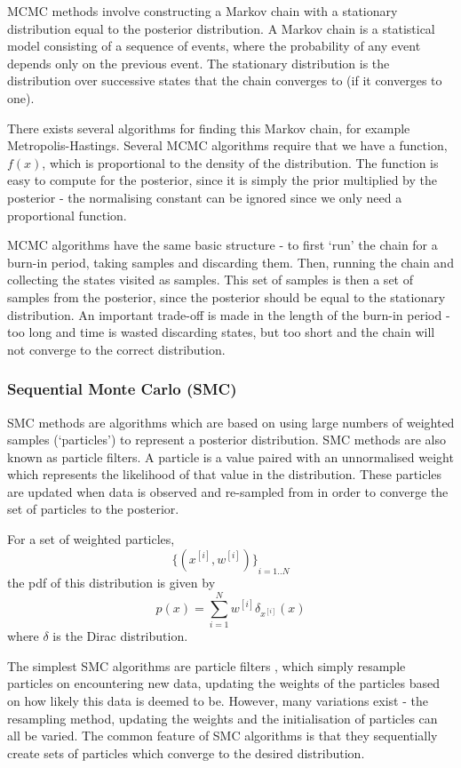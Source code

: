 MCMC methods involve constructing a Markov chain with a stationary distribution equal to the posterior distribution. A Markov chain is a statistical model consisting of a sequence of events, where the probability of any event depends only on the previous event. The stationary distribution is the distribution over successive states that the chain converges to (if it converges to one).
		
There exists several algorithms for finding this Markov chain, for example Metropolis-Hastings. Several MCMC algorithms require that we have a function, $f(x)$, which is proportional to the density of the distribution. The function is easy to compute for the posterior, since it is simply the prior multiplied by the posterior - the normalising constant can be ignored since we only need a proportional function.
		
MCMC algorithms have the same basic structure - to first `run' the chain for a burn-in period, taking samples and discarding them. Then, running the chain and collecting the states visited as samples. This set of samples is then a set of samples from the posterior, since the posterior should be equal to the stationary distribution. An important trade-off is made in the length of the burn-in period - too long and time is wasted discarding states, but too short and the chain will not converge to the correct distribution.
	
\subsubsection{Sequential Monte Carlo (SMC)}
	
SMC methods are algorithms which are based on using large numbers of weighted samples (`particles') to represent a posterior distribution. SMC methods are also known as particle filters. A particle is a value paired with an unnormalised weight which represents the likelihood of that value in the distribution. These particles are updated when data is observed and re-sampled from in order to converge the set of particles to the posterior.
	
For a set of weighted particles, 
\[{\{(x^{[i]}, w^{[i]})\}}_{i=1..N}\]
% 
the pdf of this distribution is given by
% 
\[
	p(x) = \sum_{i=1}^{N}w^{[i]}\delta_{x^{[i]}}(x)
\]
where $\delta$ is the Dirac distribution.
	
The simplest SMC algorithms are particle filters \cite{particlefilter}, which simply resample particles on encountering new data, updating the weights of the particles based on how likely this data is deemed to be. However, many variations exist - the resampling method, updating the weights and the initialisation of particles can all be varied. The common feature of SMC algorithms is that they sequentially create sets of particles which converge to the desired distribution.
	
